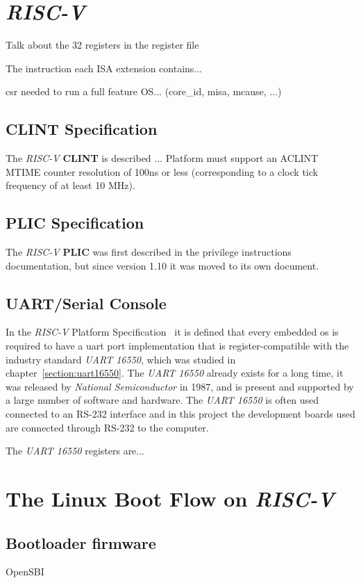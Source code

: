 \section{\textit{RISC-V}}
\label{section:riscv}
Talk about the 32 registers in the register file

The instruction each ISA extension contains...

\acrfull{csr} needed to run a full feature OS... (core\_id, misa, mcause, ...)

\subsection{CLINT Specification}
The \textit{RISC-V} \textbf{CLINT} is described ...
Platform must support an ACLINT MTIME counter resolution of 100ns or less (corresponding to a clock tick frequency of at least 10 MHz).

\subsection{PLIC Specification}
The \textit{RISC-V} \textbf{PLIC} was first described in the privilege instructions documentation, but since version 1.10 it was moved to its own document.

\subsection{UART/Serial Console}
\label{section:serial_console}
In the \textit{RISC-V} Platform Specification~\cite{riscv_platform_specification} it is defined that every embedded \acrfull{os} is required to have a \acrshort{uart} port implementation that is register-compatible with the industry standard \textit{UART 16550}, which was studied in chapter~\ref{section:uart16550}. The \textit{UART 16550} already exists for a long time, it was released by \textit{National Semiconductor} in 1987, and is present and supported by a large number of software and hardware. The \textit{UART 16550} is often used connected to an RS-232 interface and in this project the development boards used are connected through RS-232 to the computer.

The \textit{UART 16550} registers are...

\section{The Linux Boot Flow on \textit{RISC-V}}
\label{section:linux_boot_flow}
\subsection{Bootloader firmware}
OpenSBI
